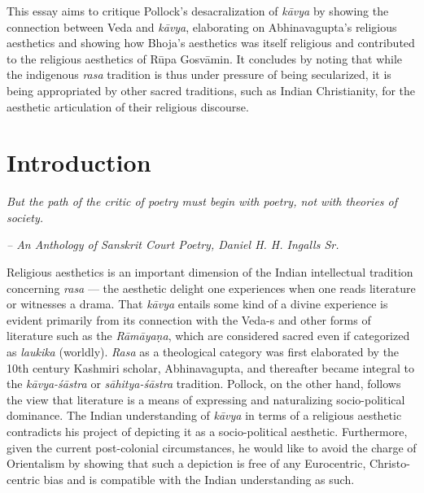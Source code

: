 This essay aims to critique Pollock's desacralization of \textsl{kāvya} by showing the connection between Veda and \textsl{kāvya}, elaborating on Abhinavagupta's religious aesthetics and showing how Bhoja's aesthetics was itself religious and contributed to the religious aesthetics of Rūpa Gosvāmin. It concludes by noting that while the indigenous \textsl{rasa} tradition is thus under pressure of being secularized, it is being appropriated by other sacred traditions, such as Indian Christianity, for the aesthetic articulation of their religious discourse.

\section*{Introduction}

\textsl{But the path of the critic of poetry must begin with poetry, not with theories of society.}

\hfill \textsl{-- An Anthology of Sanskrit Court Poetry, Daniel H. H. Ingalls Sr.}

\smallskip

Religious aesthetics is an important dimension of the Indian intellectual tradition concerning \textsl{rasa} --- the aesthetic delight one experiences when one reads literature or witnesses a drama. That \textsl{kāvya} entails some kind of a divine experience is evident primarily from its connection with the Veda-s and other forms of literature such as the \textsl{Rāmāyaṇa}, which are considered sacred even if categorized as \textsl{laukika} (worldly). \textsl{Rasa} as a theological category was first elaborated by the 10th century Kashmiri scholar, Abhinavagupta, and thereafter became integral to the \textsl{kāvya-śāstra} or \textsl{sāhitya-śāstra} tradition. Pollock, on the other hand, follows the view that literature is a means of expressing and naturalizing socio-political dominance. The Indian understanding of \textsl{kāvya} in terms of a religious aesthetic contradicts his project of depicting it as a socio-political aesthetic. Furthermore, given the current post-colonial circumstances, he would like to avoid the charge of Orientalism by showing that such a depiction is free of any Eurocentric, Christo-centric bias and is compatible with the Indian understanding as such.

